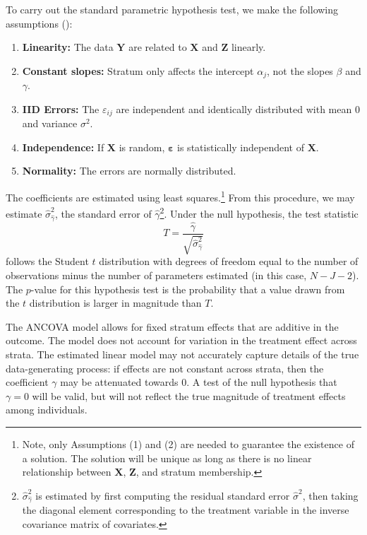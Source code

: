 \documentclass[11pt]{article}
\newcommand{\eps}{\varepsilon}
\begin{document}
To carry out the standard parametric hypothesis test, we make the following assumptions (\cite{freedman_statistical_2005}):

\begin{enumerate}
\item \textbf{Linearity:} The data $\mathbf{Y}$ are related to $\mathbf{X}$ and $\mathbf{Z}$ linearly.
\item \textbf{Constant slopes:} Stratum only affects the intercept $\alpha_j$, not the slopes $\beta$ and $\gamma$.
\item \textbf{IID Errors:} The $\eps_{ij}$ are independent and identically distributed with mean $0$ and variance $\sigma^2$.
\item \textbf{Independence:} If $\mathbf{X}$ is random, $\mathbf{\varepsilon}$ is statistically independent of $\mathbf{X}$.
\item \textbf{Normality:} The errors are normally distributed.
\end{enumerate}

The coefficients are estimated using least squares.\footnote{
Note, only Assumptions (1) and (2) are needed to guarantee the existence of a solution.
The solution will be unique as long as there is no linear relationship between $\mathbf{X}$, $\mathbf{Z}$, and stratum membership.
}
From this procedure, we may estimate $\hat{\sigma}_{\hat{\gamma}}^2$, the  standard error of $\hat{\gamma}$\footnote{
$\hat{\sigma}_{\hat{\gamma}}^2$ is estimated by first computing the residual standard error $\hat{\sigma}^2$,
then taking the diagonal element corresponding to the treatment variable in the inverse covariance matrix of covariates.
}.
Under the null hypothesis, the test statistic 
$$ T = \frac{\hat{\gamma}}{\sqrt{ \hat{\sigma}_{\hat{\gamma}}^2}}$$
follows the Student $t$ distribution with degrees of freedom equal to the number of observations minus the number of parameters estimated (in this case, $N - J - 2$).
The $p$-value for this hypothesis test is the probability that a value drawn from the $t$ distribution is larger in magnitude than $T$.


The ANCOVA model allows for fixed stratum effects that are additive in the outcome.  
The model does not account for variation in the treatment effect across strata.  
The estimated linear model may not accurately capture details of the true data-generating process:
if effects are not constant across strata, then the coefficient $\gamma$ may be attenuated towards 0.  
A test of the null hypothesis that $\gamma = 0$ will be valid, but will not reflect the true magnitude of treatment effects among individuals.
\end{document}
